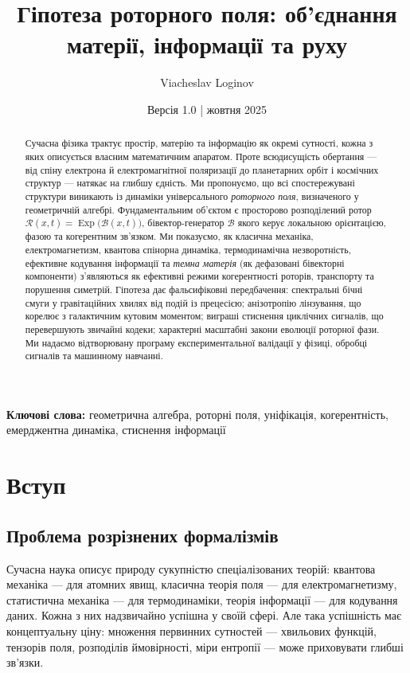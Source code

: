 \documentclass[11pt,a4paper]{article}
\title{\textbf{Гіпотеза роторного поля: об'єднання матерії, інформації та руху}}
\author[1]{Viacheslav Loginov}
\affil[1]{Київ, Україна\\ \texttt{barthez.slavik@gmail.com}}
\date{\small Версія 1.0 \quad|\quad 10 жовтня 2025}
\newcommand{\Exp}{\operatorname{Exp}}
\newcommand{\Rotor}{\mathcal{R}}
\newcommand{\Biv}{\mathcal{B}}
\theoremstyle{definition}
\theoremstyle{plain}
\theoremstyle{remark}
\begin{document}
\maketitle

\begin{abstract}
\noindent
Сучасна фізика трактує простір, матерію та інформацію як окремі сутності, кожна з яких описується власним математичним апаратом. Проте всюдисущість обертання — від спіну електрона й електромагнітної поляризації до планетарних орбіт і космічних структур — натякає на глибшу єдність. Ми пропонуємо, що всі спостережувані структури виникають із динаміки універсального \emph{роторного поля}, визначеного у геометричній алгебрі. Фундаментальним об'єктом є просторово розподілений ротор $\Rotor(x,t)=\Exp\!\big(\Biv(x,t)\big)$, бівектор-генератор $\Biv$ якого керує локальною орієнтацією, фазою та когерентним зв'язком. Ми показуємо, як класична механіка, електромагнетизм, квантова спінорна динаміка, термодинамічна незворотність, ефективне кодування інформації та \emph{темна матерія} (як дефазовані бівекторні компоненти) з'являються як ефективні режими когерентності роторів, транспорту та порушення симетрій. Гіпотеза дає фальсифіковні передбачення: спектральні бічні смуги у гравітаційних хвилях від подій із прецесією; анізотропію лінзування, що корелює з галактичним кутовим моментом; виграші стиснення циклічних сигналів, що перевершують звичайні кодеки; характерні масштабні закони еволюції роторної фази. Ми надаємо відтворювану програму експериментальної валідації у фізиці, обробці сигналів та машинному навчанні.
\end{abstract}

\noindent\textbf{Ключові слова:} геометрична алгебра, роторні поля, уніфікація, когерентність, емерджентна динаміка, стиснення інформації

\vspace{1em}

\section{Вступ}

\subsection{Проблема розрізнених формалізмів}

Сучасна наука описує природу сукупністю спеціалізованих теорій: квантова механіка — для атомних явищ, класична теорія поля — для електромагнетизму, статистична механіка — для термодинаміки, теорія інформації — для кодування даних. Кожна з них надзвичайно успішна у своїй сфері. Але така успішність має концептуальну ціну: множення первинних сутностей — хвильових функцій, тензорів поля, розподілів ймовірності, міри ентропії — може приховувати глибші зв’язки.
\end{document}
